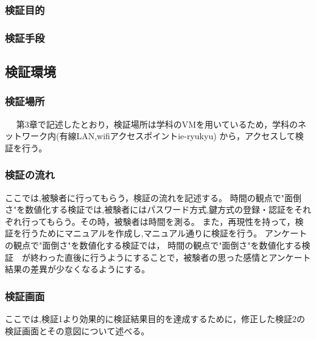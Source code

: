     \subsubsection{検証目的}
    \subsubsection{検証手段} 
  \subsection{検証環境} 
    \subsubsection{検証場所}%
    　  第3章で記述したとおり，検証場所は学科のVMを用いているため，学科のネットワーク内(有線LAN,wifiアクセスポイント{ie-ryukyu})
        から，アクセスして検証を行う。
    \subsubsection{検証の流れ}%
        ここでは,被験者に行ってもらう，検証の流れを記述する。
        時間の観点で"面倒さ"を数値化する検証では,被験者にはパスワード方式,鍵方式の登録・認証をそれぞれ行ってもらう。その時，被験者は時間を測る。 
        また，再現性を持って，検証を行うためにマニュアルを作成し,マニュアル通りに検証を行う。
        アンケートの観点で"面倒さ"を数値化する検証では，
        時間の観点で"面倒さ"を数値化する検証　が終わった直後に行うようにすることで，被験者の思った感情とアンケート結果の差異が少なくなるようにする。


    \subsubsection{検証画面}

    ここでは,検証1より効果的に検証結果目的を達成するために，修正した検証2の検証画面とその意図について述べる。


